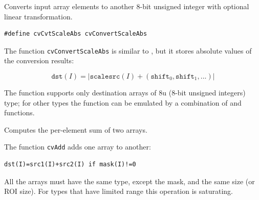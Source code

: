 \label{ConvertScaleAbs}

Converts input array elements to another 8-bit unsigned integer with optional linear transformation.


\begin{lstlisting}
#define cvCvtScaleAbs cvConvertScaleAbs
\end{lstlisting}

\begin{description}
\end{description}


The function \texttt{cvConvertScaleAbs} is similar to , but it stores absolute values of the conversion results:

\[
\texttt{dst}(I) = |\texttt{scale} \texttt{src}(I) + (\texttt{shift}_0,\texttt{shift}_1,...)|
\]

The function supports only destination arrays of 8u (8-bit unsigned integers) type; for other types the function can be emulated by a combination of  and  functions.

\label{Add}

Computes the per-element sum of two arrays.


\begin{description}
\end{description}

The function \texttt{cvAdd} adds one array to another:

\begin{lstlisting}
dst(I)=src1(I)+src2(I) if mask(I)!=0
\end{lstlisting}

All the arrays must have the same type, except the mask, and the same size (or ROI size).
For types that have limited range this operation is saturating.

